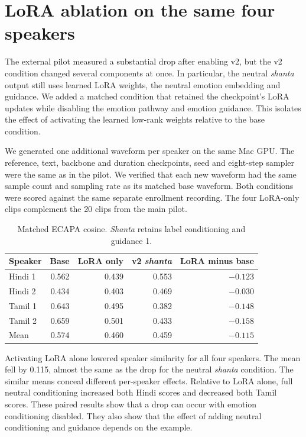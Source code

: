 \documentclass[11pt,a4paper]{article}
\newcommand{\sectionpage}[1]{\clearpage\section{#1}}
\begin{document}
\sectionpage{LoRA ablation on the same four speakers}
The external pilot measured a substantial drop after enabling v2, but the v2 condition changed several components at once. In particular, the neutral \emph{shanta} output still uses learned LoRA weights, the neutral emotion embedding and guidance. We added a matched condition that retained the checkpoint's LoRA updates while disabling the emotion pathway and emotion guidance. This isolates the effect of activating the learned low-rank weights relative to the base condition.

We generated one additional waveform per speaker on the same Mac GPU. The reference, text, backbone and duration checkpoints, seed and eight-step sampler were the same as in the pilot. We verified that each new waveform had the same sample count and sampling rate as its matched base waveform. Both conditions were scored against the same separate enrollment recording. The four LoRA-only clips complement the 20 clips from the main pilot.

\begin{table}[!h]
\centering
\caption{Matched ECAPA cosine. \emph{Shanta} retains label conditioning and guidance 1.}
\begin{tabular}{@{}lrrrr@{}}
\toprule
Speaker & Base & LoRA only & v2 \emph{shanta} & LoRA minus base \\
\midrule
Hindi 1 & 0.562 & 0.439 & 0.553 & \(-0.123\) \\
Hindi 2 & 0.434 & 0.403 & 0.469 & \(-0.030\) \\
Tamil 1 & 0.643 & 0.495 & 0.382 & \(-0.148\) \\
Tamil 2 & 0.659 & 0.501 & 0.433 & \(-0.158\) \\
\midrule
Mean & 0.574 & 0.460 & 0.459 & \(-0.115\) \\
\bottomrule
\end{tabular}
\end{table}

Activating LoRA alone lowered speaker similarity for all four speakers. The mean fell by 0.115, almost the same as the drop for the neutral \emph{shanta} condition. The similar means conceal different per-speaker effects. Relative to LoRA alone, full neutral conditioning increased both Hindi scores and decreased both Tamil scores. These paired results show that a drop can occur with emotion conditioning disabled. They also show that the effect of adding neutral conditioning and guidance depends on the example.
\end{document}
